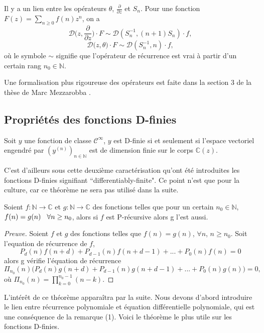 \documentclass[a4paper,10pt]{article}
\begin{document}
	\begin{remarque}
		Il y a un lien entre les opérateurs $\theta$, $\frac{\partial }{\partial z}$ et $S_n$. Pour une fonction $F(z)=\sum_{n\geq 0}f(n)z^n$, on a
		\[\mathcal{D}\big(z,\frac{\partial}{\partial z}\big)\cdot F \sim \mathcal{D}(S_n^{-1},(n+1)S_n) \cdot f,\]
		\[\mathcal{D}(z,\theta\big)\cdot F\sim\mathcal{D}(S_n^{-1},n)\cdot f,\]
		où le symbole $\sim$ signifie que l'opérateur de récurrence est vrai à partir d'un certain rang $n_0 \in \mathbb{N}$.
	\end{remarque}
	
	Une formalisation plus rigoureuse des opérateurs est faite dans la section 3 de la thèse de Marc Mezzarobba \cite{Mezzarobba2011}.
	
	\subsection{Propriétés des fonctions D-finies}
	\begin{theorem}
		Soit $y$ une fonction de classe $\mathcal{C}^{\infty}$, $y$ est D-finie si et seulement si l'espace vectoriel engendré par $(y^{(n)})_{n \in \mathbb{N}}$ est de dimension finie sur le corps $\mathbb{C}(z)$.
	\end{theorem}
	C'est d'ailleurs sous cette deuxième caractérisation qu'ont été introduites les fonctions D-finies signifiant ``differentiably-finite". Ce point n'est que pour la culture, car ce théorème ne sera pas utilisé dans la suite.
	\begin{theorem}
		Soient $f:\mathbb{N}\rightarrow \mathbb{C}$ et $g:\mathbb{N}\rightarrow \mathbb{C}$ des fonctions telles que pour un certain $n_0 \in \mathbb{N}$, $f(n)=g(n) \hspace{3mm} \forall n\geq n_0$, alors si $f$ est P-récursive alors g l'est aussi.   
		\label{rec_rest}
	\end{theorem}
   \vspace{3mm}
	\begin{proof}[Preuve]
		Soient $f$ et $g$ des fonctions telles que $f(n)=g(n)$, $\forall n$, $n\geq n_0$. Soit l'equation de récurrence de $f$,
		\[P_d(n)f(n+d)+P_{d-1}(n)f(n+d-1)+...+P_0(n)f(n)=0\]
		alors g vérifie l'équation de récurrence
		\[\Pi_{n_0}(n)\Big(P_d(n)g(n+d)+P_{d-1}(n)g(n+d-1)+...+P_0(n)g(n)\Big)=0,\]
		où $\Pi_{n_0}(n)=\prod_{k=0}^{n_0-1}(n-k)$.
	\end{proof}
	
	L'intérêt de ce théorème apparaîtra par la suite. Nous devons d'abord introduire le lien entre récurrence polynomiale et équation différentielle polynomiale, qui est une conséquence de la remarque (1).
	Voici le théorème le plus utile sur les fonctions D-finies.
	
\end{document}
